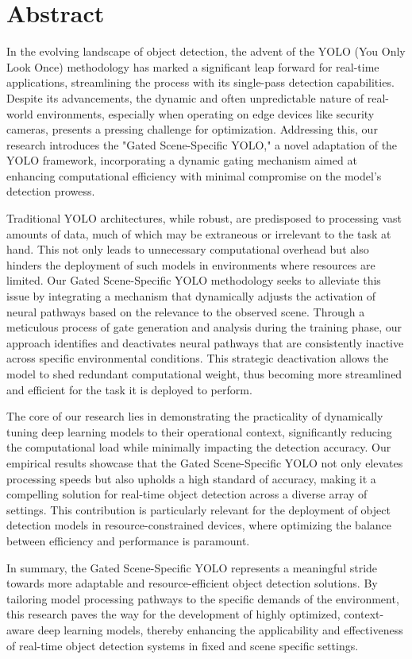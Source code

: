 \section*{Abstract} 						%

In the evolving landscape of object detection, the advent of the YOLO (You Only Look Once) methodology has marked a significant leap forward for real-time applications, streamlining the process with its single-pass detection capabilities. Despite its advancements, the dynamic and often unpredictable nature of real-world environments, especially when operating on edge devices like security cameras, presents a pressing challenge for optimization. Addressing this, our research introduces the "Gated Scene-Specific YOLO," a novel adaptation of the YOLO framework, incorporating a dynamic gating mechanism aimed at enhancing computational efficiency with minimal compromise on the model's detection prowess.

Traditional YOLO architectures, while robust, are predisposed to processing vast amounts of data, much of which may be extraneous or irrelevant to the task at hand. This not only leads to unnecessary computational overhead but also hinders the deployment of such models in environments where resources are limited. Our Gated Scene-Specific YOLO methodology seeks to alleviate this issue by integrating a mechanism that dynamically adjusts the activation of neural pathways based on the relevance to the observed scene. Through a meticulous process of gate generation and analysis during the training phase, our approach identifies and deactivates neural pathways that are consistently inactive across specific environmental conditions. This strategic deactivation allows the model to shed redundant computational weight, thus becoming more streamlined and efficient for the task it is deployed to perform.

The core of our research lies in demonstrating the practicality of dynamically tuning deep learning models to their operational context, significantly reducing the computational load while minimally impacting the detection accuracy. Our empirical results showcase that the Gated Scene-Specific YOLO not only elevates processing speeds but also upholds a high standard of accuracy, making it a compelling solution for real-time object detection across a diverse array of settings. This contribution is particularly relevant for the deployment of object detection models in resource-constrained devices, where optimizing the balance between efficiency and performance is paramount.

In summary, the Gated Scene-Specific YOLO represents a meaningful stride towards more adaptable and resource-efficient object detection solutions. By tailoring model processing pathways to the specific demands of the environment, this research paves the way for the development of highly optimized, context-aware deep learning models, thereby enhancing the applicability and effectiveness of real-time object detection systems in fixed and scene specific settings.

\clearpage
